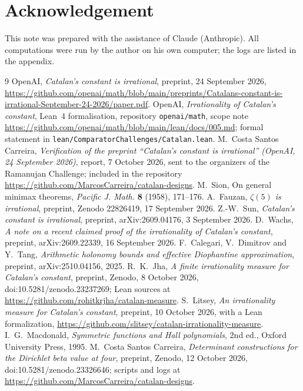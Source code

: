 \documentclass[11pt]{article}
\theoremstyle{definition}
\newcommand{\repo}{\url{https://github.com/MarcosCarreira/catalan-designs}}
\begin{document}
\section*{Acknowledgement}
This note was prepared with the assistance of Claude (Anthropic). All computations were run by the author on his own computer; the logs are listed in the appendix.

\begin{thebibliography}{9}
 OpenAI, \emph{Catalan's constant is irrational}, preprint, 24 September 2026, \url{https://github.com/openai/math/blob/main/preprints/Catalans-constant-is-irrational-September-24-2026/paper.pdf}.
 OpenAI, \emph{Irrationality of Catalan's constant}, Lean~4 formalisation, repository \texttt{openai/math}, scope note \url{https://github.com/openai/math/blob/main/lean/docs/005.md}; formal statement in \texttt{lean/ComparatorChallenges/Catalan.lean}.
 M.~Costa Santos Carreira, \emph{Verification of the preprint ``Catalan's constant is irrational'' (OpenAI, 24 September 2026)}, report, 7 October 2026, sent to the organizers of the Ramanujan Challenge; included in the repository \repo.
 M.~Sion, On general minimax theorems, \emph{Pacific J. Math.} \textbf{8} (1958), 171--176.
 A.~Fauzan, \emph{$\zeta(5)$ is irrational}, preprint, Zenodo 22826419, 17 September 2026.
 Z.-W.~Sun, \emph{Catalan's constant is irrational}, preprint, arXiv:2609.04176, 3 September 2026.
 D.~Wachs, \emph{A note on a recent claimed proof of the irrationality of Catalan's constant}, preprint, arXiv:2609.22339, 16 September 2026.
 F.~Calegari, V.~Dimitrov and Y.~Tang, \emph{Arithmetic holonomy bounds and effective Diophantine approximation}, preprint, arXiv:2510.04156, 2025.
 R.~K.~Jha, \emph{A finite irrationality measure for Catalan's constant}, preprint, Zenodo, 8 October 2026, doi:10.5281/zenodo.23237269; Lean sources at \url{https://github.com/rohitkrjha/catalan-measure}.
 S.~Litsey, \emph{An irrationality measure for Catalan's constant}, preprint, 10 October 2026, with a Lean formalization, \url{https://github.com/slitsey/catalan-irrationality-measure}.
 I.~G.~Macdonald, \emph{Symmetric functions and Hall polynomials}, 2nd ed., Oxford University Press, 1995.
 M.~Costa Santos Carreira, \emph{Determinant constructions for the Dirichlet beta value at four}, preprint, Zenodo, 12 October 2026, doi:10.5281/zenodo.23326646; scripts and logs at \url{https://github.com/MarcosCarreira/catalan-designs}.
\end{thebibliography}
\end{document}
